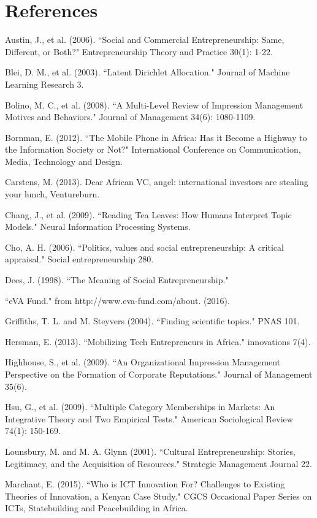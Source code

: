 \documentclass[12pt]{article}
\begin{document}
\section{References}

\begingroup\small
	
	
Austin, J., et al. (2006). ``Social and Commercial Entrepreneurship: Same, Different, or Both?" Entrepreneurship Theory and Practice 30(1): 1-22.
	
Blei, D. M., et al. (2003). ``Latent Dirichlet Allocation." Journal of Machine Learning Research 3.
	
Bolino, M. C., et al. (2008). ``A Multi-Level Review of Impression Management Motives and Behaviors." Journal of Management 34(6): 1080-1109.
	
Bornman, E. (2012). ``The Mobile Phone in Africa: Has it Become a Highway to the Information Society or Not?" International Conference on Communication, Media, Technology and Design.
	
Carstens, M. (2013). Dear African VC, angel: international investors are stealing your lunch, Ventureburn.
	
Chang, J., et al. (2009). ``Reading Tea Leaves: How Humans Interpret Topic Models." Neural Information Processing Systems.
	
Cho, A. H. (2006). ``Politics, values and social entrepreneurship: A critical appraisal." Social entrepreneurship 280.
	
Dees, J. (1998). ``The Meaning of Social Entrepreneurship."

``eVA Fund." from http://www.eva-fund.com/about. (2016). 
	
Griffiths, T. L. and M. Steyvers (2004). ``Finding scientific topics." PNAS 101.
	
Hersman, E. (2013). ``Mobilizing Tech Entrepreneurs in Africa." innovations 7(4).
	
Highhouse, S., et al. (2009). ``An Organizational Impression Management Perspective on the Formation of Corporate Reputations." Journal of Management 35(6).
	
Hsu, G., et al. (2009). ``Multiple Category Memberships in Markets: An Integrative Theory and Two Empirical Tests." American Sociological Review 74(1): 150-169.
	
Lounsbury, M. and M. A. Glynn (2001). ``Cultural Entrepreneurship: Stories, Legitimacy, and the Acquisition of Resources." Strategic Management Journal 22.
	
Marchant, E. (2015). ``Who is ICT Innovation For? Challenges to Existing Theories of Innovation, a Kenyan Case Study." CGCS Occasional Paper Series on ICTs, Statebuilding and Peacebuilding in Africa.
	
\end{document}
